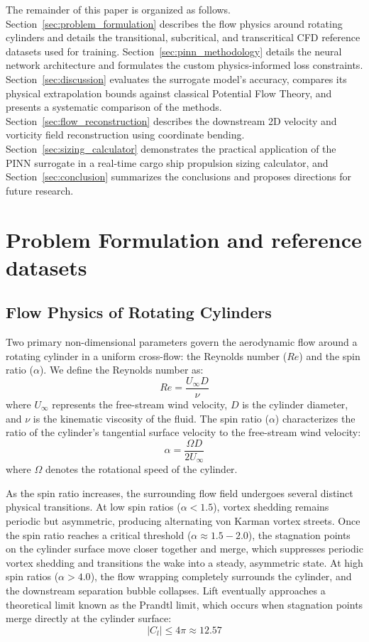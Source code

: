 \documentclass[aip,pof,reprint,onecolumn,amsmath,amssymb,graphicx,longbibliography]{revtex4-2}
\begin{document}
The remainder of this paper is organized as follows. Section~\ref{sec:problem_formulation} describes the flow physics around rotating cylinders and details the transitional, subcritical, and transcritical CFD reference datasets used for training. Section~\ref{sec:pinn_methodology} details the neural network architecture and formulates the custom physics-informed loss constraints. Section~\ref{sec:discussion} evaluates the surrogate model's accuracy, compares its physical extrapolation bounds against classical Potential Flow Theory, and presents a systematic comparison of the methods. Section~\ref{sec:flow_reconstruction} describes the downstream 2D velocity and vorticity field reconstruction using coordinate bending. Section~\ref{sec:sizing_calculator} demonstrates the practical application of the PINN surrogate in a real-time cargo ship propulsion sizing calculator, and Section~\ref{sec:conclusion} summarizes the conclusions and proposes directions for future research.

\section{\label{sec:problem_formulation}Problem Formulation and reference datasets}

\subsection{\label{subsec:magnus_physics}Flow Physics of Rotating Cylinders}
Two primary non-dimensional parameters govern the aerodynamic flow around a rotating cylinder in a uniform cross-flow: the Reynolds number ($Re$) and the spin ratio ($\alpha$). We define the Reynolds number as:
\begin{equation}
Re = \frac{U_{\infty} D}{\nu}
\end{equation}
where $U_{\infty}$ represents the free-stream wind velocity, $D$ is the cylinder diameter, and $\nu$ is the kinematic viscosity of the fluid. The spin ratio ($\alpha$) characterizes the ratio of the cylinder's tangential surface velocity to the free-stream wind velocity:
\begin{equation}
\alpha = \frac{\Omega D}{2 U_{\infty}}
\end{equation}
where $\Omega$ denotes the rotational speed of the cylinder.

As the spin ratio increases, the surrounding flow field undergoes several distinct physical transitions. At low spin ratios ($\alpha < 1.5$), vortex shedding remains periodic but asymmetric, producing alternating von Karman vortex streets. Once the spin ratio reaches a critical threshold ($\alpha \approx 1.5 - 2.0$), the stagnation points on the cylinder surface move closer together and merge, which suppresses periodic vortex shedding and transitions the wake into a steady, asymmetric state. At high spin ratios ($\alpha > 4.0$), the flow wrapping completely surrounds the cylinder, and the downstream separation bubble collapses. Lift eventually approaches a theoretical limit known as the Prandtl limit, which occurs when stagnation points merge directly at the cylinder surface:
\begin{equation}
|C_l| \le 4\pi \approx 12.57
\end{equation}
\end{document}
